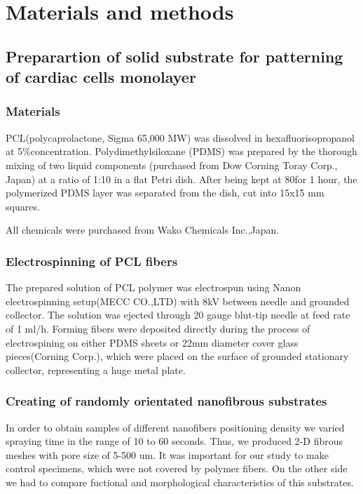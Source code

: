 \section{Materials and methods}
\label{sec:methods}

\subsection{Preparartion of solid substrate for patterning of cardiac cells monolayer}
\subsubsection{Materials}
	\label{sec:specimen_preparation_electrospinning}


PCL(polycaprolactone, Sigma 65,000 MW) was dissolved in hexafluorisopropanol at 5\%concentration.  
Polydimethylsiloxane (PDMS) was prepared by the thorough mixing of two liquid components (purchased from Dow Corning Toray Corp., Japan) at a ratio of 1:10 in a flat Petri dish. After being kept at 80\gc\space for 1 hour, the polymerized PDMS layer was separated from the dish, cut into 15x15 mm squares.

All chemicals were purchased from Wako Chemicals Inc.,Japan.
\subsubsection{Electrospinning of PCL fibers}
The prepared solution of PCL polymer was electrospun using Nanon electrospinning setup(MECC CO.,LTD) with 8kV between needle and grounded collector. The solution was ejected through 20 gauge blut-tip needle at feed rate of 1 ml/h. Forming fibers were deposited directly during the process of electrospining on either PDMS sheets or 22mm diameter cover glass pieces(Corning Corp.), which were placed on the surface of grounded stationary collector, representing a huge metal plate.    
\subsubsection{Creating of randomly orientated nanofibrous substrates }
In order to obtain samples of different nanofibers positioning density we varied spraying time in the range of 10 to 60 seconds. Thus, we produced 2-D fibrous meshes with pore size of 5-500 um. 
It was important for our study to make control specimens, which were not covered by polymer fibers. On  the other side we had to compare fuctional and morphological characteristics of this substrates.    
                                                 